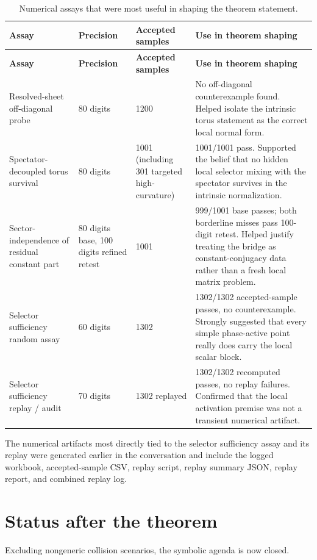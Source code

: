 \documentclass[11pt]{article}
\numberwithin{equation}{section}
\theoremstyle{definition}
\begin{document}
\begin{longtable}{P{0.27\textwidth}P{0.13\textwidth}P{0.15\textwidth}P{0.31\textwidth}} 
\caption{Numerical assays that were most useful in shaping the theorem statement.}\\
\toprule
\textbf{Assay} & \textbf{Precision} & \textbf{Accepted samples} & \textbf{Use in theorem shaping} \\
\midrule
\endfirsthead
\toprule
\textbf{Assay} & \textbf{Precision} & \textbf{Accepted samples} & \textbf{Use in theorem shaping} \\
\midrule
\endhead
Resolved-sheet off-diagonal probe & 80 digits & 1200 & No off-diagonal counterexample found. Helped isolate the intrinsic torus statement as the correct local normal form. \\
Spectator-decoupled torus survival & 80 digits & 1001 (including 301 targeted high-curvature) & 1001/1001 pass. Supported the belief that no hidden local selector mixing with the spectator survives in the intrinsic normalization. \\
Sector-independence of residual constant part & 80 digits base, 100 digits refined retest & 1001 & 999/1001 base passes; both borderline misses pass 100-digit retest. Helped justify treating the bridge as constant-conjugacy data rather than a fresh local matrix problem. \\
Selector sufficiency random assay & 60 digits & 1302 & 1302/1302 accepted-sample passes, no counterexample. Strongly suggested that every simple phase-active point really does carry the local scalar block. \\
Selector sufficiency replay / audit & 70 digits & 1302 replayed & 1302/1302 recomputed passes, no replay failures. Confirmed that the local activation premise was not a transient numerical artifact. \\
\bottomrule
\end{longtable}

The numerical artifacts most directly tied to the selector sufficiency assay and its replay were generated earlier in the conversation and include the logged workbook, accepted-sample CSV, replay script, replay summary JSON, replay report, and combined replay log.

\section{Status after the theorem}

Excluding nongeneric collision scenarios, the symbolic agenda is now closed.
\end{document}
